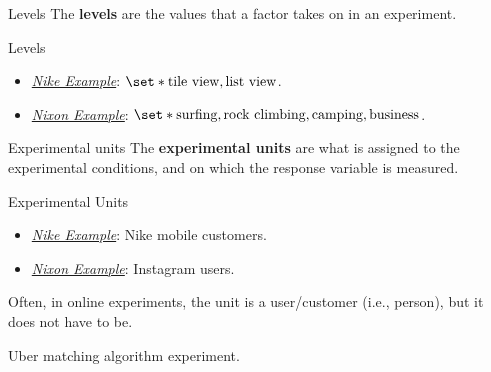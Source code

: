 \begin{Definition}{Levels}{}
    The \textbf{levels} are the values that a factor takes on in an experiment.
\end{Definition}
\begin{Example}{Levels}{}
    \begin{itemize}
        \item \emph{\hyperref[ex:nike_ex]{Nike Example}}: $ \set*{\text{tile view}, \text{list view}} $.
        \item \emph{\hyperref[ex:nixon_ex]{Nixon Example}}: $ \set*{\text{surfing}, \text{rock climbing}, \text{camping}, \text{business}} $.
    \end{itemize}
\end{Example}
\begin{Definition}{Experimental units}{}
    The \textbf{experimental units} are what is assigned to the experimental conditions,
    and on which the response variable is measured.
\end{Definition}
\begin{Example}{Experimental Units}{}
    \begin{itemize}
        \item \emph{\hyperref[ex:nike_ex]{Nike Example}}: Nike mobile customers.
        \item \emph{\hyperref[ex:nixon_ex]{Nixon Example}}: Instagram users.
    \end{itemize}
\end{Example}
\begin{Remark}{}{}
    Often, in online experiments, the unit is a user/customer (i.e., person), but it does
    not have to be.
    \begin{Example}{}{}
        Uber matching algorithm experiment.
    \end{Example}
\end{Remark}
